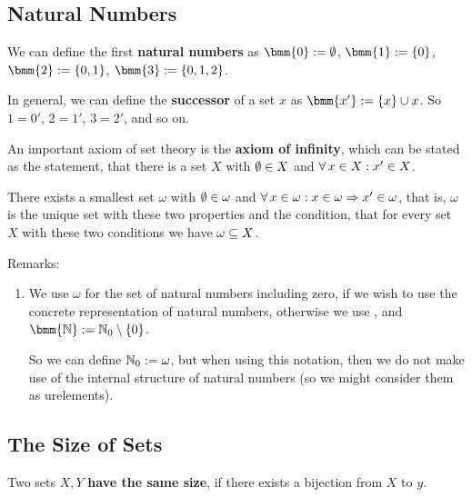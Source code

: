 \documentclass[12pt]{book}
\begin{document}
\subsection{Natural Numbers}
\label{sec:natnumbers}

\begin{defi}\label{def:natnumberssimple}
  We can define the first \textbf{natural numbers} as $\bmm{0} := \es$, $\bmm{1} := \set{0}$, $\bmm{2} := \set{0,1}$, $\bmm{3} := \set{0,1,2}$.

  In general, we can define the \textbf{successor} of a set $x$ as $\bmm{x'} := \set{x} \cup x$. So $1 = 0'$, $2 = 1'$, $3 = 2'$, and so on.

  An important axiom of set theory is the \textbf{axiom of infinity}, which can be stated as the statement, that there is a set $X$ with $\emptyset \in X$ and $\forall\, x \in X : x' \in X$.
\end{defi}

\begin{lem}\label{lem:omega}
  There exists a smallest set $\omega$ with $\emptyset \in \omega$ and $\forall\, x \in \omega : x \in \omega \Rightarrow x' \in \omega$, that is, $\omega$ is the unique set with these two properties and the condition, that for every set $X$ with these two conditions we have $\omega \subseteq X$.
\end{lem}
Remarks:
\begin{enumerate}
\item We use $\omega$ for the set of natural numbers including zero, if we wish to use the concrete representation of natural numbers, otherwise we use \bmm{\NNZ}, and $\bmm{\NN} := \NNZ \sm \set{0}$.

  So we can define $\mathbb{N}_0 := \omega$, but when using this notation, then we do not make use of the internal structure of natural numbers (so we might consider them as urelements).
\end{enumerate}


\subsection{The Size of Sets}
\label{sec:sizeofsets}

\begin{defi}\label{def:equalsize}
  Two sets $X, Y$ \textbf{have the same size}, if there exists a bijection from $X$ to $y$.
\end{defi}
\end{document}
